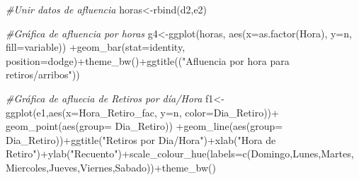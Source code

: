 \documentclass[
]{article}
\newenvironment{Shaded}{\begin{snugshade}}{\end{snugshade}}
\newcommand{\AttributeTok}[1]{\textcolor[rgb]{0.77,0.63,0.00}{#1}}
\newcommand{\CommentTok}[1]{\textcolor[rgb]{0.56,0.35,0.01}{\textit{#1}}}
\newcommand{\FunctionTok}[1]{\textcolor[rgb]{0.00,0.00,0.00}{#1}}
\newcommand{\NormalTok}[1]{#1}
\newcommand{\OtherTok}[1]{\textcolor[rgb]{0.56,0.35,0.01}{#1}}
\newcommand{\SpecialCharTok}[1]{\textcolor[rgb]{0.00,0.00,0.00}{#1}}
\newcommand{\StringTok}[1]{\textcolor[rgb]{0.31,0.60,0.02}{#1}}
\begin{document}
\begin{Shaded}
\begin{Highlighting}[]
\CommentTok{\#Unir datos de afluencia}
\NormalTok{horas}\OtherTok{\textless{}{-}}\FunctionTok{rbind}\NormalTok{(d2,e2)}

\CommentTok{\#Gráfica de afluencia por horas}
\NormalTok{g4}\OtherTok{\textless{}{-}}\FunctionTok{ggplot}\NormalTok{(horas, }\FunctionTok{aes}\NormalTok{(}\AttributeTok{x=}\FunctionTok{as.factor}\NormalTok{(Hora), }\AttributeTok{y=}\NormalTok{n, }\AttributeTok{fill=}\NormalTok{variable)) }\SpecialCharTok{+}\FunctionTok{geom\_bar}\NormalTok{(}\AttributeTok{stat=}\StringTok{\textquotesingle{}identity\textquotesingle{}}\NormalTok{, }\AttributeTok{position=}\StringTok{\textquotesingle{}dodge\textquotesingle{}}\NormalTok{)}\SpecialCharTok{+}\FunctionTok{theme\_bw}\NormalTok{()}\SpecialCharTok{+}\FunctionTok{ggtitle}\NormalTok{((}\StringTok{"Afluencia por hora para retiros/arribos"}\NormalTok{))}

\CommentTok{\#Gráfica de afluecia de Retiros por día/Hora}
\NormalTok{f1}\OtherTok{\textless{}{-}}\FunctionTok{ggplot}\NormalTok{(e1,}\FunctionTok{aes}\NormalTok{(}\AttributeTok{x=}\NormalTok{Hora\_Retiro\_fac, }\AttributeTok{y=}\NormalTok{n, }\AttributeTok{color=}\NormalTok{Dia\_Retiro))}\SpecialCharTok{+} \FunctionTok{geom\_point}\NormalTok{(}\FunctionTok{aes}\NormalTok{(}\AttributeTok{group=}\NormalTok{ Dia\_Retiro)) }\SpecialCharTok{+}\FunctionTok{geom\_line}\NormalTok{(}\FunctionTok{aes}\NormalTok{(}\AttributeTok{group=}\NormalTok{ Dia\_Retiro))}\SpecialCharTok{+}\FunctionTok{ggtitle}\NormalTok{(}\StringTok{"Retiros por Dia/Hora"}\NormalTok{)}\SpecialCharTok{+}\FunctionTok{xlab}\NormalTok{(}\StringTok{"Hora de Retiro"}\NormalTok{)}\SpecialCharTok{+}\FunctionTok{ylab}\NormalTok{(}\StringTok{"Recuento"}\NormalTok{)}\SpecialCharTok{+}\FunctionTok{scale\_colour\_hue}\NormalTok{(}\AttributeTok{labels=}\FunctionTok{c}\NormalTok{(}\StringTok{\textquotesingle{}Domingo\textquotesingle{}}\NormalTok{,}\StringTok{\textquotesingle{}Lunes\textquotesingle{}}\NormalTok{,}\StringTok{\textquotesingle{}Martes\textquotesingle{}}\NormalTok{,}\StringTok{\textquotesingle{}Miercoles\textquotesingle{}}\NormalTok{,}\StringTok{\textquotesingle{}Jueves\textquotesingle{}}\NormalTok{,}\StringTok{\textquotesingle{}Viernes\textquotesingle{}}\NormalTok{,}\StringTok{\textquotesingle{}Sabado\textquotesingle{}}\NormalTok{))}\SpecialCharTok{+}\FunctionTok{theme\_bw}\NormalTok{()}


\end{Highlighting}
\end{Shaded}
\end{document}
